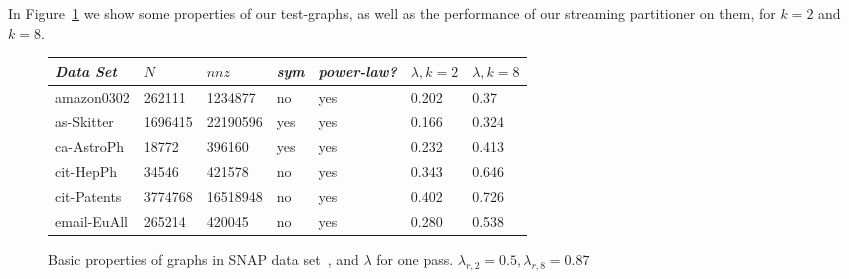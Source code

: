 
In Figure~\ref{table:big} we show some properties of our test-graphs, as well as the performance of our streaming partitioner on them, for $k=2$ and $k=8$.

\begin{figure}
\caption{Basic properties of graphs in SNAP data set~\cite{Leskovec-data}, and $\lambda$ for one pass. $\lambda_{r,2}=0.5,\lambda_{r,8}=0.87$}
\centering
{ \begin{tabular}{ *7l }    \toprule
\label{table:big}
\emph{Data Set} & $N$ & $nnz$ & \emph{sym} & \emph{power-law?} & $\lambda, k=2$ & $\lambda, k=8$ \\\midrule
amazon0302 & 262111 & 1234877 & no & yes & 0.202&0.37\\
as-Skitter & 1696415 & 22190596 & yes & yes & 0.166&0.324\\
ca-AstroPh & 18772 & 396160 & yes & yes & 0.232&0.413\\
cit-HepPh & 34546 & 421578 & no & yes & 0.343&0.646\\
cit-Patents & 3774768 & 16518948 & no & yes & 0.402&0.726\\
email-EuAll & 265214 & 420045 & no & yes & 0.280&0.538\\

\end{tabular}}
\end{figure}
